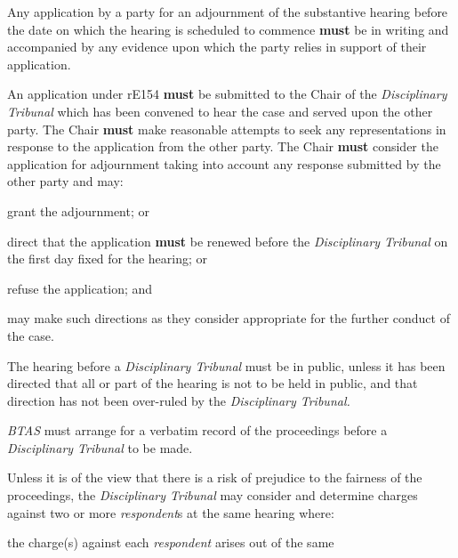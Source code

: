 Any application by a party for an adjournment of the substantive hearing
before the date on which the hearing is scheduled to commence  \textcolor{myred}{\textbf{must}} be in
writing and accompanied by any evidence upon which the party relies in
support of their application.\\
\par
An application under rE154  \textcolor{myred}{\textbf{must}} be submitted to the Chair of
the\emph{ Disciplinary Tribunal} which has been convened to hear the
case and served upon the other party. The Chair  \textcolor{myred}{\textbf{must}} make reasonable
attempts to seek any representations in response to the application from
the other party. The Chair  \textcolor{myred}{\textbf{must}} consider the application for adjournment
taking into account any response submitted by the other party and may:\\\nl \item grant the adjournment; or\item direct that the application  \textcolor{myred}{\textbf{must}} be renewed before
the \emph{Disciplinary Tribunal }on the\textbf{ }first day fixed for the
hearing; or\item refuse the application; and\item may make such directions as they consider appropriate for the further
conduct of the case.\ln
{}\par
{}
The hearing before a \emph{Disciplinary Tribunal }must be in public,
unless it has been directed that all or part of the hearing is not to be
held in public, and that direction has not been over-ruled by
the \emph{Disciplinary Tribunal.}\par
{}\par
{}
\emph{BTAS }must arrange for a verbatim record of the proceedings before
a \emph{Disciplinary Tribunal }to be made.\\
\par
{}
Unless it is of the view that there is a risk of prejudice to the
fairness of the proceedings, the \emph{Disciplinary Tribunal }may
consider and determine charges against two or more \emph{respondent}s at
the same hearing where:\\\nl \item the charge(s) against each \emph{respondent} arises out of the same
